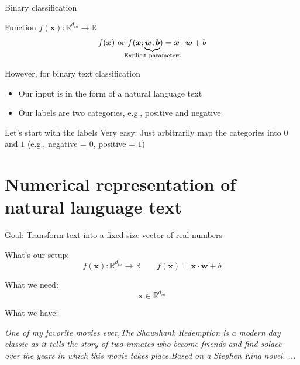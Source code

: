 \documentclass[12pt,aspectratio=169,handout]{beamer}
\begin{document}
\begin{frame}{Binary classification}

Function $f(\bm{x}) : \mathbb{R}^{d_{in}} \to \mathbb{R}$
$$f(\bm{x}) \text{ or }
f(\bm{x}; \underbrace{\bm{w}, \bm{b}}_{\mathclap{\text{Explicit parameters}}})
= \bm{x} \cdot \bm{w} + b$$

However, for binary text classification
\begin{itemize}
	\item Our input is in the form of a natural language text
	\item Our labels are two categories, e.g., positive and negative
\end{itemize}

\begin{block}{Let's start with the labels}
Very easy: Just arbitrarily map the categories into $0$ and $1$ (e.g., negative = $0$, positive = $1$)
\end{block}

\end{frame}



\section{Numerical representation of natural language text}


\begin{frame}{Goal: Transform text into a fixed-size vector of real numbers}

What's our setup:
$$f(\bm{x}) : \mathbb{R}^{d_{in}} \to \mathbb{R} \qquad
f(\bm{x}) = \bm{x} \cdot \bm{w} + b$$

What we need:
$$\bm{x} \in \mathbb{R}^{d_{in}}$$

What we have:

\emph{One of my favorite movies ever,The Shawshank Redemption is a modern day classic as it tells the story of two inmates who become friends and find solace over the years in which this movie takes place.Based on a Stephen King novel, ...}

\end{frame}
\end{document}
